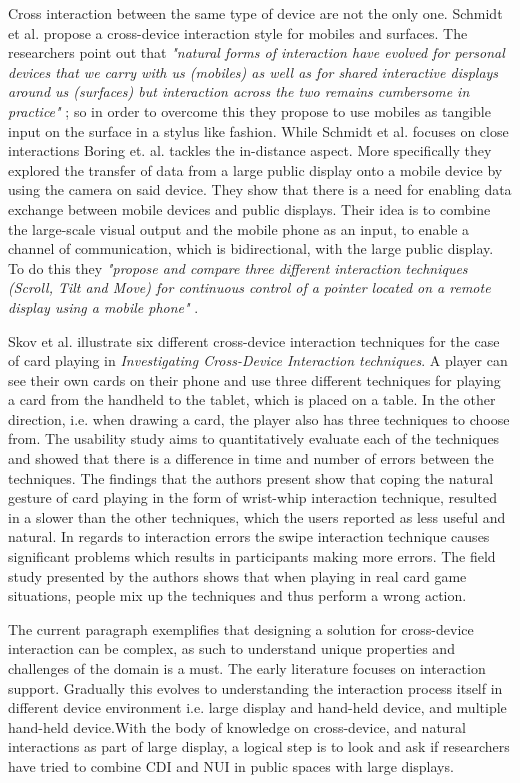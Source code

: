 Cross interaction between the same type of device are not the only one. Schmidt et al. propose a cross-device interaction style for mobiles and surfaces. The researchers point out that \emph{"natural forms of interaction have evolved for personal devices that we carry with us (mobiles) as well as for shared interactive displays around us (surfaces) but interaction across the two remains cumbersome in practice"} \cite{Schmidt:2012}; so in order to overcome this they propose to use mobiles as tangible input on the surface in a stylus like fashion. While Schmidt et al. focuses on close interactions Boring et. al. tackles the in-distance aspect. More specifically they explored
the transfer of data from a large public display onto a mobile
device by using the camera on said device.  They show
that there is a need for enabling data exchange between mobile
devices and public displays. Their idea is to combine the large-scale visual output and the mobile phone as an input, to enable a channel of communication, which is bidirectional, with the large public display. To do this they \emph{"propose and compare three different interaction techniques (Scroll, Tilt and Move) for continuous control of a pointer located on a remote display using a mobile phone"} \cite{Boring:2009}.

Skov et al. \cite{Skov:2015} illustrate six different cross-device interaction techniques for the case of card playing in \emph{Investigating Cross-Device Interaction techniques}.
A player can see their own cards on their phone and use three different techniques for playing a card from the handheld to the tablet, which is placed on a table.
In the other direction, i.e. when drawing a card, the player also has three techniques to choose from.
The usability study aims to quantitatively evaluate each of the techniques and showed that there is a difference in time and number of errors between the techniques. The findings that the authors present show that coping the natural gesture of card playing in the form of wrist-whip interaction technique, resulted in a slower than the other techniques, which the users reported as less useful and natural. In regards to interaction errors the swipe interaction technique causes significant problems which results in participants making more errors. The field study presented by the authors shows that when playing in real card game situations, people mix up the techniques and thus perform a wrong action.

The current paragraph exemplifies that designing a solution for cross-device interaction can be complex, as such to understand  unique properties and challenges of the domain is a must. The early literature focuses on interaction support. Gradually this evolves to understanding the interaction process itself in different device environment i.e. large display and hand-held device, and multiple hand-held device.With the body of knowledge on cross-device, and natural interactions as part of large display, a logical step is to look and ask if researchers have tried to combine CDI and NUI in public spaces with large displays.
